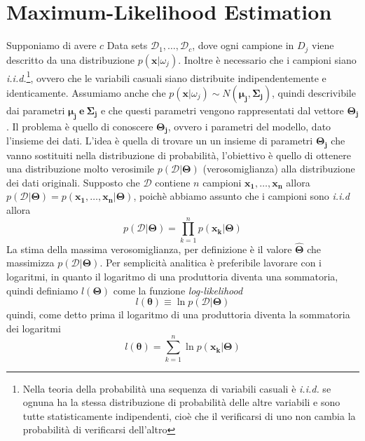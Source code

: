 \section{Maximum-Likelihood Estimation} 
Supponiamo di avere $c$ Data sets $\mathcal{D}_1, \dots, \mathcal{D}_c$, dove ogni campione in $D_j$ viene descritto da una distribuzione $p(\mathbf{x}|\omega_j)$. Inoltre è necessario che i campioni siano \emph{i.i.d.}\footnote{Nella teoria della probabilità una sequenza di variabili casuali è \emph{i.i.d.} se ognuna ha la stessa distribuzione di probabilità delle altre variabili e sono tutte statisticamente indipendenti, cioè che il verificarsi di uno non cambia la probabilità di verificarsi dell'altro}, ovvero che le variabili casuali siano distribuite indipendentemente e identicamente. Assumiamo anche che $p(\mathbf{x}|\omega_j) \sim N(\mathbf{\mu_j, \Sigma_j})$, quindi descrivibile dai parametri $\mathbf{\mu_j \ \text{e} \ \Sigma_j}$ e che questi parametri vengono rappresentati dal vettore $\mathbf{\Theta_j}$. Il problema è quello di conoscere $\mathbf{\Theta_j}$, ovvero i parametri del modello, dato l'insieme dei dati.  L'idea è quella di trovare un un insieme di parametri $\mathbf{\Theta_j}$ che vanno sostituiti nella distribuzione di probabilità, l'obiettivo è quello di ottenere una distribuzione molto verosimile $p(\mathcal{D}|\mathbf{\Theta})$ (verosomiglianza) alla distribuzione dei dati originali. Supposto che $\mathcal{D}$ contiene $n$ campioni $\mathbf{x_1, \dots, x_n}$ allora $p(\mathcal{D}|\mathbf{\Theta}) = p(\mathbf{x_1, \dots, x_n}|\mathbf{\Theta})$, poichè abbiamo assunto che i campioni sono \emph{i.i.d} allora
\begin{equation}
p(\mathcal{D}|\mathbf{\Theta}) = \prod_{k=1}^n p(\mathbf{x_k}|\mathbf{\Theta})
\end{equation}
La stima della massima verosomiglianza, per definizione è il valore $\mathbf{\hat{\Theta}}$ che massimizza $p(\mathcal{D}| \mathbf{\Theta})$. Per semplicità analitica è preferibile lavorare con i logaritmi, in quanto il logaritmo di una produttoria diventa una sommatoria, quindi definiamo $l(\mathbf{\Theta})$ come la funzione \emph{log-likelihood}
\begin{equation}
l(\mathbf{\theta}) \equiv \ln p(\mathcal{D}|\mathbf{\Theta})
\end{equation}
quindi, come detto prima il logaritmo di una produttoria diventa la sommatoria dei logaritmi
\begin{equation}
l(\mathbf{\theta})  = \sum_{k=1}^n  \ln p(\mathbf{x_k|\Theta})
\end{equation}
